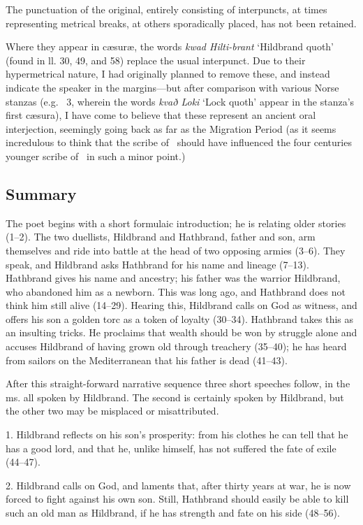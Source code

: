 The punctuation of the original, entirely consisting of interpuncts, at times representing metrical breaks, at others sporadically placed, has not been retained.

Where they appear in cæsuræ, the words \emph{kwad Hilti-brant} ‘Hildbrand quoth’ (found in ll. 30, 49, and 58) replace the usual interpunct. Due to their hypermetrical nature, I had originally planned to remove these, and instead indicate the speaker in the margins—but after comparison with various Norse stanzas (e.g. \Reginsmal\ 3, wherein the words \emph{kvað Loki} ‘Lock quoth’ appear in the stanza’s first cæsura), I have come to believe that these represent an ancient oral interjection, seemingly going back as far as the Migration Period (as it seems incredulous to think that the scribe of \HildMS\ should have influenced the four centuries younger scribe of \Regius\ in such a minor point.)

\sectionline

\subsection{Summary}

The poet begins with a short formulaic introduction; he is relating older stories (1–2).  The two duellists, Hildbrand and Hathbrand, father and son, arm themselves and ride into battle at the head of two opposing armies (3–6). They speak, and Hildbrand asks Hathbrand for his name and lineage (7–13). Hathbrand gives his name and ancestry; his father was the warrior Hildbrand, who abandoned him as a newborn. This was long ago, and Hathbrand does not think him still alive (14–29). Hearing this, Hildbrand calls on God as witness, and offers his son a golden torc as a token of loyalty (30–34). Hathbrand takes this as an insulting tricks. He proclaims that wealth should be won by struggle alone and accuses Hildbrand of having grown old through treachery (35–40); he has heard from sailors on the Mediterranean that his father is dead (41–43).

After this straight-forward narrative sequence three short speeches follow, in the ms. all spoken by Hildbrand. The second is certainly spoken by Hildbrand, but the other two may be misplaced or misattributed.

1. Hildbrand reflects on his son’s prosperity: from his clothes he can tell that he has a good lord, and that he, unlike himself, has not suffered the fate of exile (44–47).

2. Hildbrand calls on God, and laments that, after thirty years at war, he is now forced to fight against his own son. Still, Hathbrand should easily be able to kill such an old man as Hildbrand, if he has strength and fate on his side (48–56).

